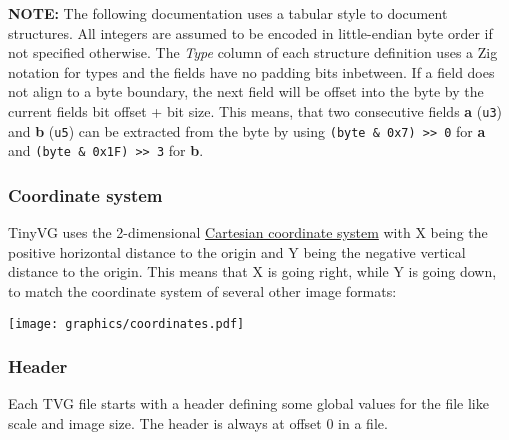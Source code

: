 \documentclass[]{article}
\begin{document}
\textbf{NOTE:} The following documentation uses a tabular style to
document structures. All integers are assumed to be encoded in
little-endian byte order if not specified otherwise. The \emph{Type}
column of each structure definition uses a Zig notation for types and
the fields have no padding bits inbetween. If a field does not align to
a byte boundary, the next field will be offset into the byte by the
current fields bit offset + bit size. This means, that two consecutive
fields \textbf{a} (\texttt{u3}) and \textbf{b} (\texttt{u5}) can be
extracted from the byte by using
\texttt{(byte\ \&\ 0x7)\ \textgreater{}\textgreater{}\ 0} for \textbf{a}
and \texttt{(byte\ \&\ 0x1F)\ \textgreater{}\textgreater{}\ 3} for
\textbf{b}.

\hypertarget{coordinate-system}{%
\subsubsection{Coordinate system}\label{coordinate-system}}

TinyVG uses the 2-dimensional
\href{https://en.wikipedia.org/wiki/Cartesian_coordinate_system}{Cartesian
coordinate system} with X being the positive horizontal distance to the
origin and Y being the negative vertical distance to the origin. This
means that X is going right, while Y is going down, to match the
coordinate system of several other image formats:

\texttt{[image: graphics/coordinates.pdf]}

\hypertarget{header}{%
\subsubsection{Header}\label{header}}

Each TVG file starts with a header defining some global values for the
file like scale and image size. The header is always at offset 0 in a
file.
\end{document}
